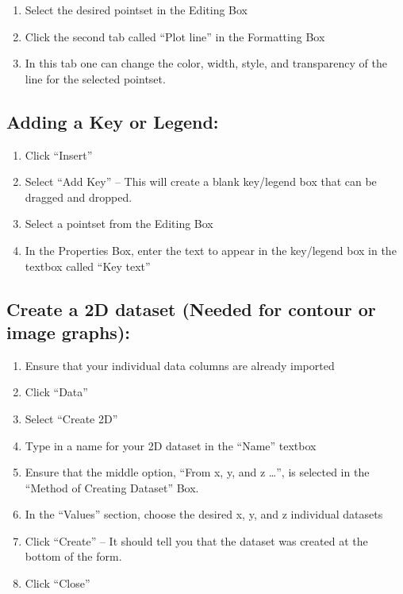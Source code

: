 \begin{enumerate}
\item Select the desired pointset in the Editing Box
\item Click the second tab called ``Plot line'' in the Formatting Box
\item In this tab one can change the color, width, style, and transparency of the line for the selected pointset.
\end{enumerate}

\subsection{Adding a Key or Legend:}

\begin{enumerate}
\item Click ``Insert''
\item Select ``Add Key'' -- This will create a blank key/legend box that can be dragged and dropped.
\item Select a pointset from the Editing Box
\item In the Properties Box, enter the text to appear in the key/legend box in the textbox called ``Key text''
\end{enumerate}

\subsection{Create a 2D dataset (Needed for contour or image graphs):}

\begin{enumerate}
\item Ensure that your individual data columns are already imported
\item Click ``Data''
\item Select ``Create 2D''
\item Type in a name for your 2D dataset in the ``Name'' textbox
\item Ensure that the middle option, ``From x, y, and z {\ldots}'', is selected in the ``Method of Creating Dataset'' Box.
\item In the ``Values'' section, choose the desired x, y, and z individual datasets
\item Click ``Create'' -- It should tell you that the dataset was created at the bottom of the form.
\item Click ``Close''
\end{enumerate}
	
